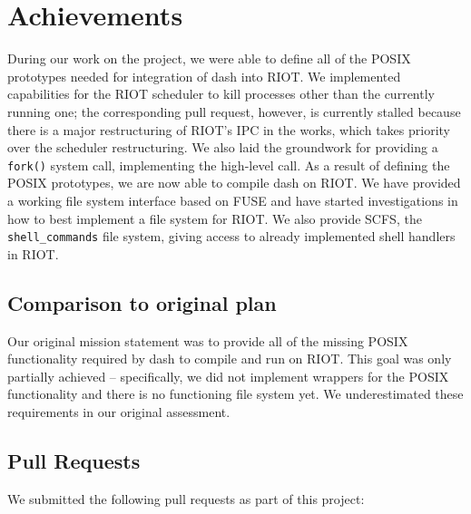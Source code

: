 \documentclass[conference]{IEEEtran}
\begin{document}
\section{Achievements}
\label{sec:Achievements}
During our work on the project, we were able to define all of the POSIX
prototypes needed for integration of dash into RIOT. We implemented
capabilities for the RIOT scheduler to kill processes other than the
currently running one; the corresponding pull request, however, is
currently stalled because there is a major restructuring of RIOT's IPC
in the works, which takes priority over the scheduler restructuring. We
also laid the groundwork for providing a \texttt{fork()} system call,
implementing the high-level call. As a result of defining the POSIX
prototypes, we are now able to compile dash on RIOT. We have provided
a working file system interface based on FUSE and have started
investigations in how to best implement a file system for RIOT. We also
provide SCFS, the \texttt{shell\_commands} file system, giving access to
already implemented shell handlers in RIOT.

\subsection{Comparison to original plan}
\label{sub:Comparison to original plan}
Our original mission statement was to provide all of the missing POSIX
functionality required by dash to compile and run on RIOT. This goal was
only partially achieved -- specifically, we did not implement wrappers
for the POSIX functionality and there is no functioning file system yet.
We underestimated these requirements in our original assessment.

\subsection{Pull Requests}
\label{sub:Pull Requests}
We submitted the following pull requests as part of this project:
\end{document}
